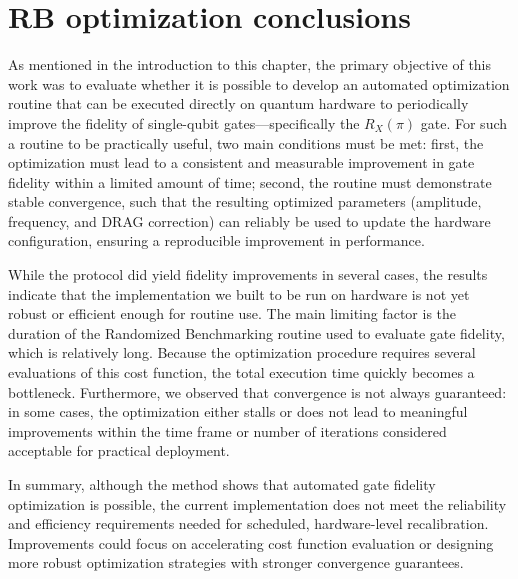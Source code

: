 \section{RB optimization conclusions}
As mentioned in the introduction to this chapter, the primary objective of this work was to evaluate whether it is possible to develop an automated optimization routine that can be executed directly on quantum hardware to periodically improve the fidelity of single-qubit gates—specifically the  $R_X(\pi)$ gate. 
For such a routine to be practically useful, two main conditions must be met: first, the optimization must lead to a consistent and measurable improvement in gate fidelity within a limited amount of time; 
second, the routine must demonstrate stable convergence, such that the resulting optimized parameters (amplitude, frequency, and DRAG correction) can reliably be used to update the hardware configuration, ensuring a reproducible improvement in performance.

While the protocol did yield fidelity improvements in several cases, the results indicate that the implementation we built to be run on hardware is not yet robust or efficient enough for routine use. 
The main limiting factor is the duration of the Randomized Benchmarking routine used to evaluate gate fidelity, which is relatively long. 
Because the optimization procedure requires several evaluations of this cost function, the total execution time quickly becomes a bottleneck. 
Furthermore, we observed that convergence is not always guaranteed: in some cases, the optimization either stalls or does not lead to meaningful improvements within the time frame or number of iterations considered acceptable for practical deployment.

In summary, although the method shows that automated gate fidelity optimization is possible, the current implementation does not meet the reliability and efficiency requirements needed for scheduled, hardware-level recalibration. 
Improvements could focus on accelerating cost function evaluation or designing more robust optimization strategies with stronger convergence guarantees.

